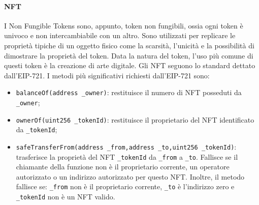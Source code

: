 \documentclass[a4paper]{article}
\begin{document}
    \paragraph{NFT}
    I Non Fungible Tokens sono, appunto, token non fungibili, ossia ogni token è univoco e non intercambiabile con un altro. Sono utilizzati per replicare le proprietà tipiche
    di un oggetto fisico come la scarsità, l'unicità e la possibilità di dimostrare la proprietà del token\cite{nft}.
    Data la natura del token, l'uso più comune di questi token è la creazione di arte digitale\cite{nftuse}.
    \newline
    Gli NFT seguono lo standard dettato dall'EIP-721. I metodi più significativi richiesti dall'EIP-721 sono:
    \begin{itemize}
      \item \verb|balanceOf(address _owner)|: restituisce il numero di NFT posseduti da \verb|_owner|;
      \item \verb|ownerOf(uint256 _tokenId)|: restituisce il proprietario del NFT identificato da \verb|_tokenId|;
      \item \verb|safeTransferFrom(address _from,address _to,uint256 _tokenId)|: trasferisce la proprietà del NFT \verb|_tokenId| da \verb|_from| a \verb|_to|.
            Fallisce se il chiamante della funzione non è il proprietario corrente, un operatore autorizzato o un indirizzo autorizzato per questo NFT.
            Inoltre, il metodo fallisce se: \verb|_from| non è il proprietario corrente, \verb|_to| è l'indirizzo zero e \verb|_tokenId| non è un NFT valido\cite{eip1155}.
    \end{itemize}
\end{document}
